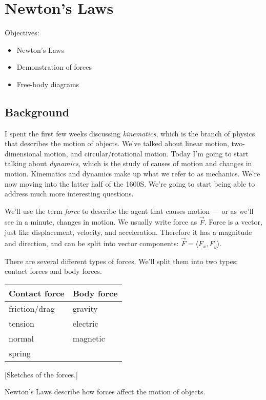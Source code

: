 \section{Newton's Laws}
Objectives:
\begin{itemize}
\item Newton's Laws
\item Demonstration of forces
\item Free-body diagrams
\end{itemize}

\subsection{Background}
I spent the first few weeks discussing \textit{kinematics}, which is the branch of physics that describes the motion of objects. We've talked about linear motion, two-dimensional motion, and circular/rotational motion. Today I'm going to start talking about \textit{dynamics}, which is the study of causes of motion and changes in motion. Kinematics and dynamics make up what we refer to as mechanics. We're now moving into the latter half of the 1600S. We're going to start being able to address much more interesting questions.

We'll use the term \textit{force} to describe the agent that causes motion --- or as we'll see in a minute, changes in motion. We usually write force as $\vec{F}$. Force is a vector, just like displacement, velocity, and acceleration. Therefore it has a magnitude and direction, and can be split into vector components: $\vec{F}=\langle{F_x,F_y}\rangle$.

There are several different types of forces. We'll split them into two types: contact forces and body forces.

\begin{table}[h]
\begin{tabular}{ll}
Contact force & Body force\\
\hline
friction/drag & gravity\\
tension & electric\\
normal & magnetic\\
spring & \\
\hline
\end{tabular}
\end{table}

[Sketches of the forces.]
\clearpage

Newton's Laws describe how forces affect the motion of objects.

